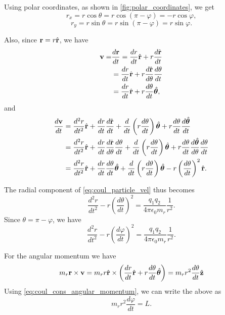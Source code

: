 \documentclass[a4paper,11pt]{report}
\begin{document}
Using polar coordinates, as shown in \cref{fig:polar_coordinates}, we get
\begin{equation*}
    r_x = r \cos \theta = r \cos ( \pi - \varphi ) = -r \cos \varphi,
\end{equation*}
\begin{equation*}
    r_y = r \sin \theta = r \sin ( \pi - \varphi ) = r \sin \varphi.
\end{equation*}

Also, since $\mathbf{r} = r \hat{\mathbf{r}}$, we have
\begin{align*}
    \mathbf{v} = &\frac{d \mathbf{r}}{dt} = \frac{dr}{dt} \hat{\mathbf{r}} + r \frac{d\hat{\mathbf{r}}}{dt} \nonumber \\
    &= \frac{d r}{dt} \hat{\mathbf{r}} + r \frac{d\hat{\mathbf{r}}}{d\theta} \frac{d\theta}{dt} \nonumber \\
    &= \frac{dr}{dt} \hat{\mathbf{r}} + r \frac{d \theta}{dt} \hat{\bm{\theta}},
\end{align*}
and
\begin{align*}
    \frac{d \mathbf{v}}{dt} &= \frac{d^2r}{dt^2} \hat{\mathbf{r}} + \frac{dr}{dt} \frac{d\hat{\mathbf{r}}}{dt} + \frac{d}{dt} \left ( r \frac{d\theta}{dt} \right ) \hat{\bm{\theta}} + r \frac{d \theta}{dt} \frac{d \hat{\bm{\theta}}}{dt} \nonumber \\
    &= \frac{d^2 r}{dt^2} \hat{\mathbf{r}} + \frac{dr}{dt} \frac{d\hat{\mathbf{r}}}{d\theta} \frac{d\theta}{dt} + \frac{d}{dt} \left ( r \frac{d\theta}{dt} \right ) \hat{\bm{\theta}} + r \frac{d \theta}{dt} \frac{d \hat{\bm{\theta}}}{d\theta} \frac{d \theta}{dt} \nonumber \\
    &= \frac{d^2r}{dt^2} \hat{\mathbf{r}} + \frac{dr}{dt} \frac{d\theta}{dt} \hat{\bm{\theta}} + \frac{d}{dt} \left ( r \frac{d\theta}{dt} \right ) \hat{\bm{\theta}} - r \left ( \frac{d\theta}{dt} \right ) ^2 \hat{\mathbf{r}}.
\end{align*}

The radial component of \cref{eq:coul_particle_vel} thus becomes 
\begin{equation*}
    \frac{d^2 r}{dt^2} - r \left ( \frac{d\theta}{dt} \right )^2 = \frac{q_1 q_2}{4 \pi \epsilon_0 m_r} \frac{1}{r^2}.
\end{equation*}
Since $\theta = \pi - \varphi$, we have
\begin{equation}
    \label{eq:coul_particle_position_ode}
    \frac{d^2 r}{dt^2} - r \left ( \frac{d\varphi}{dt} \right )^2 = \frac{q_1 q_2}{4 \pi \epsilon_0 m_r} \frac{1}{r^2}.
\end{equation}

For the angular momentum we have
\begin{equation*}
    m_r \mathbf{r} \times \mathbf{v} = m_r r \hat{\mathbf{r}} \times \left ( \frac{dr}{dt} \hat{\mathbf{r}} + r \frac{d\theta}{dt} \hat{\bm{\theta}} \right ) = m_r r^2 \frac{d\theta}{dt} \hat{\mathbf{z}}
\end{equation*}
Using \cref{eq:coul_cons_angular_momentum}, we can write the above as
\begin{equation}
    \label{eq:coul_particle_cons_angular_polar}
    m_r r^2 \frac{d\varphi}{dt} = L.
\end{equation}
\end{document}
